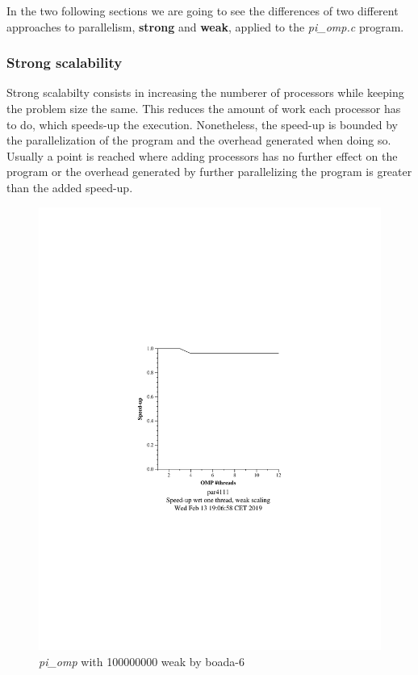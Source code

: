 \documentclass[12]{article}
\begin{document}
In the two following sections we are going to see the differences of two different approaches to parallelism, \textbf{strong} and \textbf{weak}, applied to the \textit{pi\_omp.c} program.

\subsubsection{Strong scalability}

Strong scalabilty consists in increasing the numberer of processors while keeping the problem size the same. This reduces the amount of work each processor has to do, which speeds-up the execution.
Nonetheless, the speed-up is bounded by the parallelization of the program and the overhead generated when doing so. Usually a point is reached where adding processors has no further effect on the program or the overhead generated by further parallelizing the program is greater than the added speed-up. 


\begin{figure}[H]
\centering
\includegraphics[scale=0.5]{pi_omp-100000000-1-12-3-weak-boada-6.png}
 \caption{ \textit{pi\_omp} with 100000000 weak by boada-6}
  \label{fig:pi_ompboada6}
\end{figure}
\end{document}
